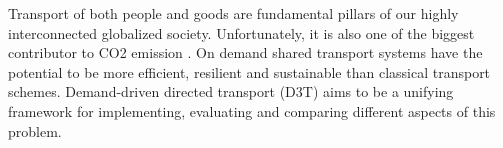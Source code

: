 Transport of both people and goods are fundamental pillars of our highly interconnected globalized society. Unfortunately, it is also one of the biggest contributor to CO2 emission \cite{ipcc2014}. On demand shared transport systems have the potential to be more efficient, resilient and sustainable than
classical transport schemes. Demand-driven directed transport (D3T) aims to be a unifying framework for implementing, evaluating and comparing different aspects of this problem. 
